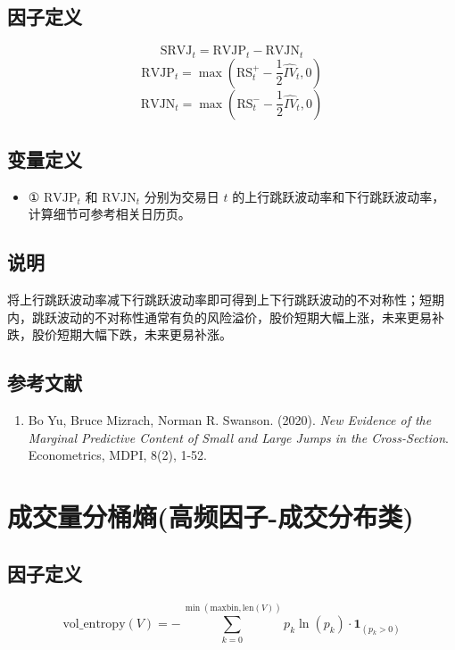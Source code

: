 \documentclass{article}
\begin{document}
\subsection{因子定义}

\begin{equation}
    \mathrm{SRVJ}_t = \mathrm{RVJP}_t - \mathrm{RVJN}_t
\end{equation}
\begin{equation}
    \mathrm{RVJP}_t = \max\left(\mathrm{RS}^+_t - \frac{1}{2}\hat{IV}_t, 0\right)
\end{equation}
\begin{equation}
    \mathrm{RVJN}_t = \max\left(\mathrm{RS}^-_t - \frac{1}{2}\hat{IV}_t, 0\right)
\end{equation}

\subsection{变量定义}
\begin{itemize}
    \item ① \( \mathrm{RVJP}_t \) 和 \( \mathrm{RVJN}_t \) 分别为交易日 \( t \) 的上行跳跃波动率和下行跳跃波动率，计算细节可参考相关日历页。
\end{itemize}

\subsection{说明}
将上行跳跃波动率减下行跳跃波动率即可得到上下行跳跃波动的不对称性；短期内，跳跃波动的不对称性通常有负的风险溢价，股价短期大幅上涨，未来更易补跌，股价短期大幅下跌，未来更易补涨。

\subsection{参考文献}
\begin{enumerate}
    \item Bo Yu, Bruce Mizrach, Norman R. Swanson. (2020). \textit{New Evidence of the Marginal Predictive Content of Small and Large Jumps in the Cross-Section}. Econometrics, MDPI, 8(2), 1-52.
\end{enumerate}

\section{成交量分桶熵(高频因子-成交分布类)}

\subsection{因子定义}
\begin{equation}
    \mathrm{vol\_entropy}(V) = -\sum_{k=0}^{\min(\mathrm{maxbin}, \mathrm{len}(V))} p_k \ln(p_k) \cdot \mathbf{1}_{(p_k > 0)}
\end{equation}
\end{document}
